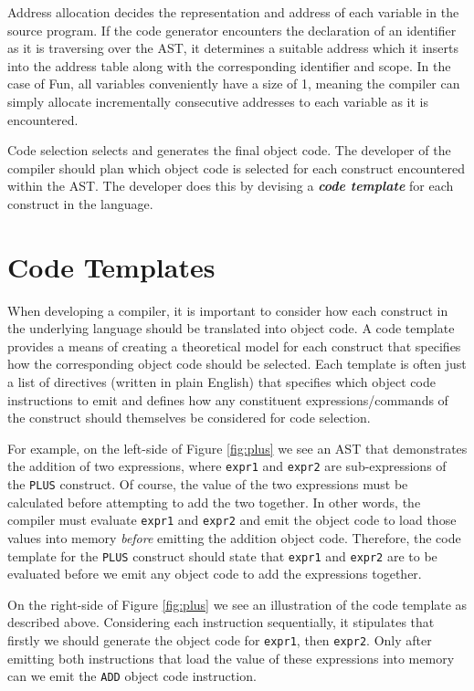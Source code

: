 \documentclass{l4proj}
\begin{document}
Address allocation decides the representation and address of each variable in the source program. If the code generator encounters the declaration of an identifier as it is traversing over the AST, it determines a suitable address which it inserts into the address table along with the corresponding identifier and scope. In the case of Fun, all variables conveniently have a size of 1, meaning the compiler can simply allocate incrementally consecutive addresses to each variable as it is encountered.

Code selection selects and generates the final object code. The developer of the compiler should plan which object code is selected for each construct encountered within the AST. The developer does this by devising a \textit{\textbf{code template}} for each construct in the language.

\section{Code Templates}
When developing a compiler, it is important to consider how each construct in the underlying language should be translated into object code. A code template provides a means of creating a theoretical model for each construct that specifies how the corresponding object code should be selected. Each template is often just a list of directives (written in plain English) that specifies which object code instructions to emit and defines how any constituent expressions/commands of the construct should themselves be considered for code selection. 

For example, on the left-side of Figure \ref{fig:plus} we see an AST that demonstrates the addition of two expressions, where \texttt{expr1} and \texttt{expr2} are sub-expressions of the \texttt{PLUS} construct. Of course, the value of the two expressions must be calculated before attempting to add the two together. In other words, the compiler must evaluate \texttt{expr1} and \texttt{expr2} and emit the object code to load those values into memory \textit{before} emitting the addition object code. Therefore, the code template for the \texttt{PLUS} construct should state that \texttt{expr1} and \texttt{expr2} are to be evaluated before we emit any object code to add the expressions together.

On the right-side of Figure \ref{fig:plus} we see an illustration of the code template as described above. Considering each instruction sequentially, it stipulates that firstly we should generate the object code for \texttt{expr1}, then \texttt{expr2}. Only after emitting both instructions that load the value of these expressions into memory can we emit the \texttt{ADD} object code instruction. 
\end{document}
